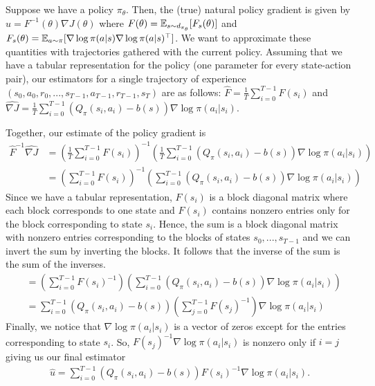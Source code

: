 Suppose we have a policy $\pi_\theta$. Then, the (true) natural policy gradient is given by 
$u = F^{-1}(\theta) \nabla J(\theta)$
where $F(\theta) = \mathbb{E}_{s \sim d_{\pi_\theta}} [F_s(\theta)]$ and $F_s(\theta) = \mathbb{E}_{a \sim \pi} [\nabla \log \pi (a|s) \nabla \log \pi(a|s)^\top]$.
We want to approximate these quantities with trajectories gathered with the current policy.
Assuming that we have a tabular representation for the policy (one parameter for every state-action pair), our estimators for a single trajectory of experience $(s_0, a_0, r_0, ..., s_{T-1}, a_{T-1}, r_{T-1}, s_T)$ are as follows:
$\hat{F} = \frac{1}{T} \sum_{i=0}^{T-1} F(s_i)$ and $\widehat{\nabla J} = \frac{1}{T} \sum_{i=0}^{T-1} (Q_\pi (s_i,a_i) - b(s)) \nabla \log \pi (a_i|s_i)$.

Together, our estimate of the policy gradient is
\begin{align*}
    \hat{F}^{-1} \widehat{\nabla J} &= \left( \frac{1}{T} \sum_{i=0}^{T-1} F(s_i) \right)^{-1} 
    \left( \frac{1}{T} \sum_{i=0}^{T-1} (Q_\pi (s_i,a_i) - b(s)) \nabla \log \pi (a_i|s_i) \right) \\
    &= \left( \sum_{i=0}^{T-1} F(s_i) \right)^{-1} 
    \left( \sum_{i=0}^{T-1} (Q_\pi (s_i,a_i) - b(s)) \nabla \log \pi (a_i|s_i) \right)
\end{align*}
Since we have a tabular representation, $F(s_i)$ is a block diagonal matrix where each block corresponds to one state and $F(s_i)$ contains nonzero entries only for the block corresponding to state $s_i$. Hence, the sum is a block diagonal matrix with nonzero entries corresponding to the blocks of states $s_0, ..., s_{T-1}$ and we can invert the sum by inverting the blocks. 
It follows that the inverse of the sum is the sum of the inverses. 
\begin{align*}
    &= \left( \sum_{i=0}^{T-1} F(s_i)^{-1} \right)
    \left( \sum_{i=0}^{T-1} (Q_\pi (s_i,a_i) - b(s)) \nabla \log \pi (a_i|s_i) \right) \\
    &= 
    \sum_{i=0}^{T-1} (Q_\pi (s_i,a_i) - b(s))  \left( \sum_{j=0}^{T-1} F(s_j)^{-1} \right) \nabla \log \pi (a_i|s_i)
\end{align*}
Finally, we notice that $\nabla \log \pi(a_i|s_i)$ is a vector of zeros except for the entries corresponding to state $s_i$. So, $F(s_j)^{-1} \nabla \log \pi(a_i|s_i)$ is nonzero only if $i = j$ giving us our final estimator
\begin{align*}
        \hat{u} = \sum_{i=0}^{T-1} (Q_\pi (s_i,a_i) - b(s))  F(s_i)^{-1} \nabla \log \pi (a_i|s_i) .
\end{align*}


